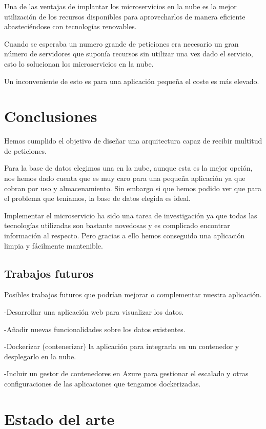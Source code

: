 \documentclass[12pt]{report} %
\begin{document}
	Una de las ventajas de implantar los microservicios en la nube es la mejor utilización de los recursos disponibles para aprovecharlos de manera eficiente abasteciéndose con tecnologías renovables.
	
	Cuando se esperaba un numero grande de peticiones era necesario un gran número de servidores que suponía recursos sin utilizar una vez dado el servicio, esto lo solucionan los microservicios en la nube.
	
	Un inconveniente de esto es para una aplicación pequeña el coste es más elevado.
	
	\section{Conclusiones}
	
	Hemos cumplido el objetivo de diseñar una arquitectura capaz de recibir multitud de peticiones.
	
	Para la base de datos elegimos una en la nube, aunque esta es la mejor opción, nos hemos dado cuenta que es muy caro para una pequeña aplicación ya que cobran por uso y almacenamiento. Sin embargo si que hemos podido ver que para el problema que teníamos, la base de datos elegida es ideal.
	
	Implementar el microservicio ha sido una tarea de investigación ya que todas las tecnologías utilizadas son bastante novedosas y es complicado encontrar información al respecto. Pero gracias a ello hemos conseguido una aplicación limpia y fácilmente mantenible.
	
	\subsection{Trabajos futuros}
	
	Posibles trabajos futuros que podrían mejorar o complementar nuestra aplicación.
	
	-Desarrollar una aplicación web para visualizar los datos.
	
	-Añadir nuevas funcionalidades sobre los datos existentes.
	
	-Dockerizar (contenerizar) la aplicación para integrarla en un contenedor y desplegarlo en la nube.
	
	-Incluir un gestor de contenedores en Azure para gestionar el escalado y otras configuraciones de las aplicaciones que tengamos dockerizadas.
	
	\section{Estado del arte}
\end{document}
